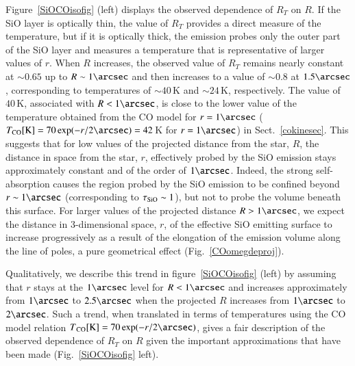\documentclass{aa}
\begin{document}
Figure~\ref{SiOCOisofig} (left) displays the observed dependence of
$R_T$  on $R$. If the SiO layer is optically thin, the value of $R_T$
provides a direct measure of the temperature, but if it is optically
thick, the emission probes only the outer part of the SiO layer and
measures a temperature that is representative of larger values of
$r$. When $R$ increases, the observed value of $R_T$ remains nearly
constant at $\sim0.65$ up to $R\sim1\arcsec$ and then increases to a
value of $\sim0.8$ at $1.5\arcsec$, corresponding to temperatures of
$\sim40$\,K and $\sim24$\,K, respectively. The value of $40$\,K,
associated with $R<1\arcsec$, is close to the lower value of the
temperature obtained from the CO model for $r=1\arcsec$ ($T_{\rm
CO}[{\rm K}]=70\exp(-r/2\arcsec)=42$\,K for $r=1\arcsec$) in
Sect.~\ref{cokinesec}. This suggests that for low values of the
projected distance from the star, $R$, the distance in space from the
star, $r$, effectively probed by the SiO emission stays approximately
constant and of the order of $1\arcsec$. Indeed, the strong
self-absorption causes the region probed by the SiO emission to be
confined beyond $r\sim1\arcsec$ (corresponding to $\tau_{\rm SiO} \sim
1$), but not to probe the volume beneath this surface. For larger
values of the projected distance $R>1\arcsec$, we expect the distance
in 3-dimensional space, $r$, of the effective SiO emitting surface to
increase progressively as a result of the elongation of the emission
volume along the line of poles, a pure geometrical effect
(Fig.~\ref{COomegdeproj}).

Qualitatively, we describe this trend in figure~\ref{SiOCOisofig}
(left) by assuming that $r$ stays at the $1\arcsec$ level for $R <
1\arcsec$ and increases approximately from $1\arcsec$ to $2.5\arcsec$
when the projected $R$ increases from $1\arcsec$ to $2\arcsec$. Such a
trend, when translated in terms of temperatures using the CO model
relation $T{\rm_{CO} [K]} = 70\exp(-r/2\arcsec)$, gives a fair
description of the observed dependence of $R_T$ on $R$ given the
important approximations that have been made (Fig.~\ref{SiOCOisofig}
left).
\end{document}
